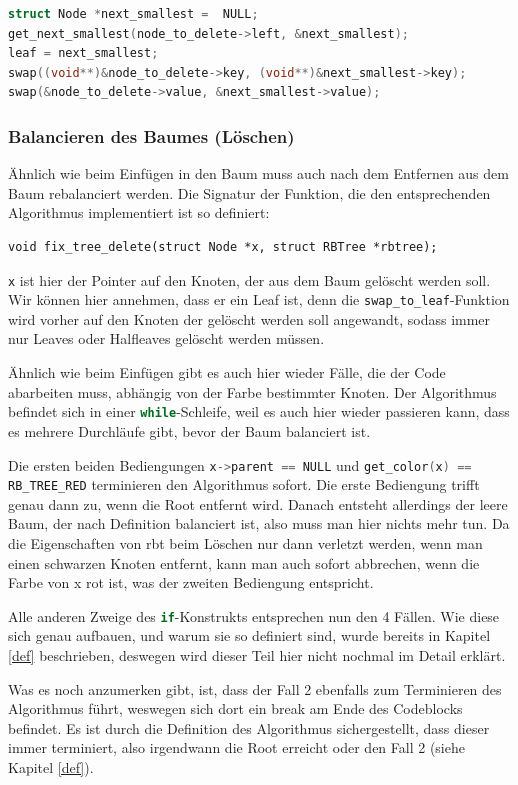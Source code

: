 \documentclass[11pt]{article}
\newcommand{\lstin}[1]{\lstinline[language=C]{#1}}
\begin{document}
\begin{lstlisting}[language=C]
struct Node *next_smallest =  NULL;
get_next_smallest(node_to_delete->left, &next_smallest);
leaf = next_smallest;
swap((void**)&node_to_delete->key, (void**)&next_smallest->key);
swap(&node_to_delete->value, &next_smallest->value);
\end{lstlisting}

\subsubsection{Balancieren des Baumes (Löschen)}
Ähnlich wie beim Einfügen in den Baum muss auch nach dem Entfernen aus dem Baum rebalanciert werden.
Die Signatur der Funktion, die den entsprechenden Algorithmus implementiert ist so definiert:
\begin{lstlisting}
void fix_tree_delete(struct Node *x, struct RBTree *rbtree);
\end{lstlisting}

\lstin{x} ist hier der Pointer auf den Knoten, der aus dem Baum gelöscht werden soll. Wir können hier annehmen, dass er ein Leaf ist,
denn die \lstin{swap_to_leaf}-Funktion wird vorher auf den Knoten der gelöscht werden soll angewandt, sodass immer nur Leaves oder Halfleaves gelöscht werden müssen.

Ähnlich wie beim Einfügen gibt es auch hier wieder Fälle, die der Code abarbeiten muss, abhängig von der Farbe bestimmter Knoten.
Der Algorithmus befindet sich in einer \lstin{while}-Schleife, weil es auch hier wieder passieren kann, dass es mehrere Durchläufe gibt, bevor der Baum balanciert ist.

Die ersten beiden Bediengungen \lstin{x->parent == NULL} und \lstin{get_color(x) == RB_TREE_RED} terminieren den Algorithmus sofort.
Die erste Bediengung trifft genau dann zu, wenn die Root entfernt wird. Danach entsteht allerdings der leere Baum, der nach Definition balanciert ist, also muss man hier nichts mehr tun.
Da die Eigenschaften von \gls{rbt} beim Löschen nur dann verletzt werden, wenn man einen schwarzen Knoten entfernt,
kann man auch sofort abbrechen, wenn die Farbe von x rot ist, was der zweiten Bediengung entspricht.

Alle anderen Zweige des \lstin{if}-Konstrukts entsprechen nun den 4 Fällen.
Wie diese sich genau aufbauen, und warum sie so definiert sind, wurde bereits in Kapitel \ref{def} beschrieben, deswegen wird dieser Teil hier nicht nochmal im Detail erklärt.

Was es noch anzumerken gibt, ist, dass der Fall 2 ebenfalls zum Terminieren des Algorithmus führt, weswegen sich dort ein break am Ende des Codeblocks befindet.
Es ist durch die Definition des Algorithmus sichergestellt, dass dieser immer terminiert, also irgendwann die Root erreicht oder den Fall 2 (siehe Kapitel \ref{def}).
\end{document}
